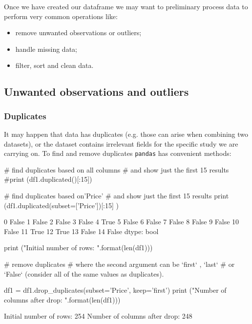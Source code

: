 Once we have created our dataframe we may want to preliminary process data to perform very common operations like:

\begin{itemize}
	\tightlist
\item remove unwanted observations or outliers;
\item handle missing data;
\item filter, sort and clean data.
\end{itemize}

\subsection{Unwanted observations and outliers}

\subsubsection{Duplicates}

It may happen that data has duplicates (e.g. those can arise when combining two datasets), or the dataset contains irrelevant fields for the specific study we are carrying on. To find and remove duplicates \texttt{pandas} has convenient methods:

\begin{ipython}
# find duplicates based on all columns
# and show just the first 15 results
#print (df1.duplicated()[:15])

# find duplicates based on'Price'
# and show just the first 15 results
print (df1.duplicated(subset=['Price'])[:15] )
\end{ipython}
\begin{ioutput}
0     False
1     False
2     False
3     False
4      True
5     False
6     False
7     False
8     False
9     False
10    False
11     True
12     True
13    False
14    False
dtype: bool
\end{ioutput}

\begin{ipython}
print ("Initial number of rows: {}".format(len(df1)))

# remove duplicates
# where the second argument can be `first` , `last`
# or `False` (consider all of the same values as duplicates).

df1 = df1.drop_duplicates(subset='Price', keep='first')
print ("Number of columns after drop: {}".format(len(df1)))
\end{ipython}
\begin{ioutput}
Initial number of rows: 254
Number of columns after drop: 248
\end{ioutput}

